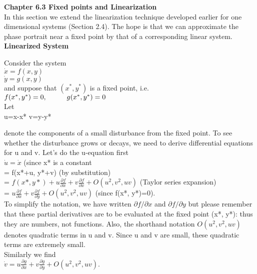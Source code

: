 \documentclass{article}
\newcommand\tab[1][1cm]{\hspace*{#1}}
\begin{document}
\textbf {Chapter 6.3 Fixed points and Linearization} \\ \tab
In this section we extend the linearization technique developed earlier for one dimensional systems (Section 2.4). The hope is that we can approximate the phase portrait near a fixed point by that of a corresponding linear system. 
\textbf {Linearized System}

Consider the system
\\ \tab $\dot{x}=f(x,y)$ 
\\ \tab $\dot{y}=g(x,y)$
\\ and suppose that $(x^{*}, y^{*})$ is a fixed point, i.e. \\ \tab
$f(x^{*},y^{*})=0, \tab g(x^{*},y^{*})=0$ \\

Let 
\\ \tab u=x-x* \tab v=y-y*

denote the components of a small disturbance from the fixed point. To see whether the disturbance grows or decays, we need to derive differential equations for u and v. Let's do the u-equation first
\\ \tab $\dot{u}=\dot{x}$ \tab \tab \tab (since x* is a constant \\
\tab = f(x*+u, y*+v) \tab \tab \tab (by substitution) \\ \tab = $f(x*,y*)+u\frac{\partial f}{\partial x} + v\frac{\partial f}{\partial x} + O(u^{2}, v^{2}, uv)$  (Taylor series expansion) \\ \tab 
= $u\frac{\partial f}{\partial x} + v \frac{\partial f}{\partial y} + O(u^{2}, v^{2}, uv)$ \tab (since f(x*, y*)=0). \\

To simplify the notation, we have written $\partial f/ \partial x$ and $\partial f / \partial y$ but please remember that these partial derivatives are to be evaluated at the fixed point (x*, y*): thus they are numbers, not functions. Also, the shorthand notation $O(u^{2}, v^{2}, uv)$ denotes quadratic terms in u and v. Since u and v are small, these quadratic terms are extremely small. \\ \tab Similarly we find
\\ \tab $\dot{v}=u\frac{\partial g}{\partial x}+v\frac{\partial g}{\partial y} + O(u^{2}, v^{2}, uv).$  \\
\end{document}
